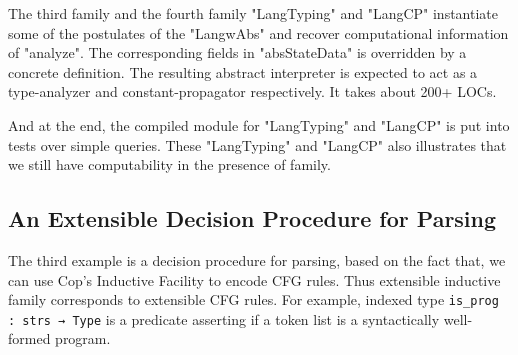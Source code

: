 The third family and the fourth family "LangTyping" and "LangCP" instantiate some of the postulates of the
"LangwAbs" and recover computational information of "analyze". The corresponding fields in "absStateData" is overridden by a concrete definition. The resulting abstract interpreter is expected
to act as a type-analyzer and constant-propagator respectively. It takes about 200+ LOCs. 


And at the end, the compiled module for "LangTyping" and "LangCP" is put into tests over simple queries. These "LangTyping" and "LangCP" also illustrates that we still have
computability in the presence of family.

\subsection{An Extensible Decision Procedure for Parsing}
\label{sec:coqexample-parser}
The third example is a decision procedure for parsing, based on the fact that, we can use Cop's Inductive Facility to encode CFG rules. Thus extensible inductive family corresponds to extensible CFG rules. For example, indexed type \texttt{is_prog : strs → Type} is a predicate asserting if a token list is a syntactically well-formed program.

